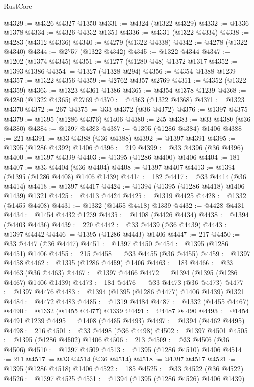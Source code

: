 \begin{lexlean}{RustCore}
\begin{coremodule}
@4329 := @4326 @4327 @1350
@4331 := @4324 (@1322 @4329)
@4332 := @1336 @1378
@4334 := @4326 @4332 @1350
@4336 := @4331 (@1322 @4334)
@4338 := @4283 (@4312 @4336)
@4340 := @4279 (@1322 @4338)
@4342 := @4278 (@1322 @4340)
@4344 := @2757 (@1322 @4342)
@4345 := @1322 @4344
@4347 := @1202 (@1374 @4345)
@4351 := @1277 (@1280 @48) @1372 @1317
@4352 := @1393 @1386
@4354 := @1327 (@1328 @294)
@4356 := @4354 @1388 @1239
@4357 := @1322 @4356
@4359 := @2762 @4357 @2769
@4361 := @4352 (@1322 @4359)
@4363 := @1323 @4361 @1386
@4365 := @4354 @1378 @1239
@4368 := @4280 (@1322 @4365) @2769
@4370 := @4363 (@1322 @4368)
@4371 := @1323 @4370
@4372 := 267
@4375 := @33 @4372 (@36 @4372)
@4376 := @1397 @4375
@4379 := @1395 (@1286 @4376) @1406
@4380 := 245
@4383 := @33 @4380 (@36 @4380)
@4384 := @1397 @4383
@4387 := @1395 (@1286 @4384) @1406
@4388 := 221
@4391 := @33 @4388 (@36 @4388)
@4392 := @1397 @4391
@4395 := @1395 (@1286 @4392) @1406
@4396 := 219
@4399 := @33 @4396 (@36 @4396)
@4400 := @1397 @4399
@4403 := @1395 (@1286 @4400) @1406
@4404 := 181
@4407 := @33 @4404 (@36 @4404)
@4408 := @1397 @4407
@4413 := @1394 (@1395 (@1286 @4408) @1406 @1439)
@4414 := 182
@4417 := @33 @4414 (@36 @4414)
@4418 := @1397 @4417
@4424 := @1394 (@1395 (@1286 @4418) @1406 @1439) @1321
@4425 := @4413 @4424
@4426 := @1319 @4425
@4428 := @1332 (@1455 @4408)
@4431 := @1332 (@1455 @4418) @1339
@4432 := @4428 @4431
@4434 := @1454 @4432 @1239
@4436 := @1408 (@4426 @4434)
@4438 := @1394 (@4403 @4436)
@4439 := 220
@4442 := @33 @4439 (@36 @4439)
@4443 := @1397 @4442
@4446 := @1395 (@1286 @4443) @1406
@4447 := 217
@4450 := @33 @4447 (@36 @4447)
@4451 := @1397 @4450
@4454 := @1395 (@1286 @4451) @1406
@4455 := 215
@4458 := @33 @4455 (@36 @4455)
@4459 := @1397 @4458
@4462 := @1395 (@1286 @4459) @1406
@4463 := 183
@4466 := @33 @4463 (@36 @4463)
@4467 := @1397 @4466
@4472 := @1394 (@1395 (@1286 @4467) @1406 @1439)
@4473 := 184
@4476 := @33 @4473 (@36 @4473)
@4477 := @1397 @4476
@4483 := @1394 (@1395 (@1286 @4477) @1406 @1439) @1321
@4484 := @4472 @4483
@4485 := @1319 @4484
@4487 := @1332 (@1455 @4467)
@4490 := @1332 (@1455 @4477) @1339
@4491 := @4487 @4490
@4493 := @1454 @4491 @1239
@4495 := @1408 (@4485 @4493)
@4497 := @1394 (@4462 @4495)
@4498 := 216
@4501 := @33 @4498 (@36 @4498)
@4502 := @1397 @4501
@4505 := @1395 (@1286 @4502) @1406
@4506 := 213
@4509 := @33 @4506 (@36 @4506)
@4510 := @1397 @4509
@4513 := @1395 (@1286 @4510) @1406
@4514 := 211
@4517 := @33 @4514 (@36 @4514)
@4518 := @1397 @4517
@4521 := @1395 (@1286 @4518) @1406
@4522 := 185
@4525 := @33 @4522 (@36 @4522)
@4526 := @1397 @4525
@4531 := @1394 (@1395 (@1286 @4526) @1406 @1439)

\end{coremodule}
\end{lexlean}
